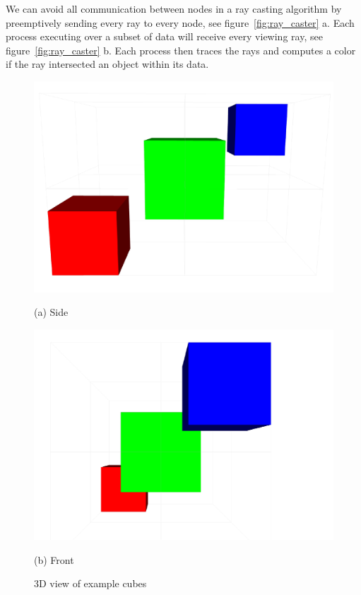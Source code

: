 We can avoid all communication between nodes in a ray casting algorithm by 
preemptively sending every ray to every node, see figure~\ref{fig:ray_caster} a.  
Each process executing over a subset of data will receive every viewing ray, see 
figure~\ref{fig:ray_caster} b.  Each process then traces the rays and computes a
color if the ray intersected an object within its data.  

\begin{figure}[!htb]
  \includegraphics[width=\linewidth]{drawings/side.pdf}
  
(a) Side

\endminipage\hfill
{}
  \includegraphics[width=\linewidth]{drawings/front.pdf}
  
(b) Front

\endminipage\hfill
\caption{3D view of example cubes}
\label{fig:cubes_3d}
\end{figure}

